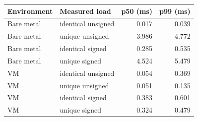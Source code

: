 \begin{tabular}{llrr}
\toprule
Environment & Measured load & p50 (ms) & p99 (ms) \\
\midrule
Bare metal & identical unsigned & 0.017 & 0.039 \\
Bare metal & unique unsigned & 3.986 & 4.772 \\
Bare metal & identical signed & 0.285 & 0.535 \\
Bare metal & unique signed & 4.524 & 5.479 \\
VM & identical unsigned & 0.054 & 0.369 \\
VM & unique unsigned & 0.051 & 0.135 \\
VM & identical signed & 0.383 & 0.601 \\
VM & unique signed & 0.324 & 0.479 \\
\bottomrule
\end{tabular}
